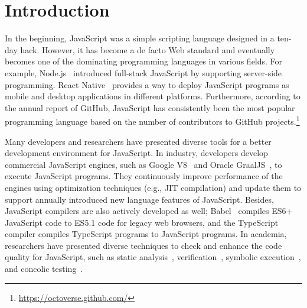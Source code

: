 \section{Introduction}\label{sec:intro}

In the beginning, JavaScript was a simple scripting language designed in a
ten-day hack. However, it has become a de facto Web standard and eventually
becomes one of the dominating programming languages in various fields. For
example, Node.js~\cite{nodejs} introduced full-stack JavaScript by supporting
server-side programming.  React Native~\cite{react-native} provides a way to
deploy JavaScript programs as mobile and desktop applications in different
platforms.  Furthermore, according to the annual report of GitHub, JavaScript
has consistently been the most popular programming language based on the number
of contributors to GitHub
projects.\footnote{\url{https://octoverse.github.com/}}

Many developers and researchers have presented diverse tools for a better
development environment for JavaScript. In industry, developers develop
commercial JavaScript engines, such as Google V8~\cite{v8} and Oracle
GraalJS~\cite{graaljs}, to execute JavaScript programs.  They continuously
improve performance of the engines using optimization techniques (e.g., JIT
compilation) and update them to support annually introduced new language
features of JavaScript.  Besides, JavaScript compilers are also actively
developed as well; Babel~\cite{babel} compiles ES6+ JavaScript code to ES5.1
code for legacy web browsers, and the TypeScript compiler compiles TypeScript
programs to JavaScript programs.  In academia, researchers have presented
diverse techniques to check and enhance the code quality for JavaScript,
such as static analysis~\cite{safe, safe2, tajs, wala, jsai},
verification~\cite{javert, javert2, ad-safety, javanni}, symbolic
execution~\cite{symbolic-js, sym-js, expo-se}, and concolic
testing~\cite{jalangi, type-conc-test}.

